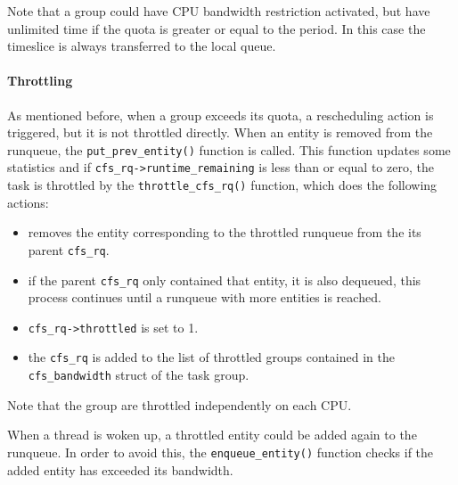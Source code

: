 Note that a group could have CPU bandwidth restriction activated, but have unlimited time if the quota is greater or equal to the period. In this case the timeslice is always transferred to the local queue.

\paragraph{Throttling}%
As mentioned before, when a group exceeds its quota, a rescheduling action is triggered, but it is not throttled directly. When an entity is removed from the runqueue, the \verb|put_prev_entity()| function is called. This function updates some statistics and if \verb|cfs_rq->runtime_remaining| is less than or equal to zero, the task is throttled by the \verb|throttle_cfs_rq()| function, which does the following actions:
\begin{itemize}
    \item removes the entity corresponding to the throttled runqueue from the its parent \verb|cfs_rq|.
    \item if the parent \verb|cfs_rq| only contained that entity, it is also dequeued, this process continues until a runqueue with more entities is reached.
    \item \verb|cfs_rq->throttled| is set to 1.
    \item the \verb|cfs_rq| is added to the list of throttled groups contained in the \verb|cfs_bandwidth| struct of the task group.
\end{itemize}
Note that the group are throttled independently on each CPU.

When a thread is woken up, a throttled entity could be added again to the runqueue. In order to avoid this, the \verb|enqueue_entity()| function checks if the added entity has exceeded its bandwidth.

